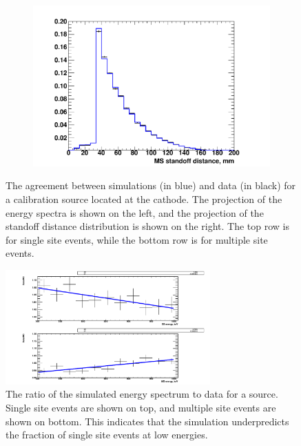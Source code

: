 \documentclass[herrin-thesis.tex]{subfiles}
\begin{document}
\begin{figure}[htb]
\begin{subfigure}[c]{0.48\textwidth}
	\end{subfigure}\hfill%
	\begin{subfigure}[c]{0.48\textwidth}
	\centering
	\includegraphics[width=\textwidth]{./plots/analysis_shape_agreement_sd_ThS5MSlin.pdf}
	\end{subfigure}
\caption[Agreement between simulation and data for a  calibration source]{The agreement between simulations (in blue) and data (in black) for a  calibration source located at the cathode. The projection of the energy spectra is shown on the left, and the projection of the standoff distance distribution is shown on the right. The top row is for single site events, while the bottom row is for multiple site events.}
\label{fig:analysis_shape_agreement}
\end{figure}

\begin{figure}[htb]
\centering
\includegraphics[width=0.7\textwidth]{./plots/analysis_shape_agreement_ratio.pdf}
\caption[Ratio of simulated spectra to data as a function of energy]{The ratio of the simulated energy spectrum to data for a  source. Single site events are shown on top, and multiple site events are shown on bottom. This indicates that the simulation underpredicts the fraction of single site events at low energies.}
\label{fig:analysis_shape_agreement_ratio}
\end{figure}
\end{document}
